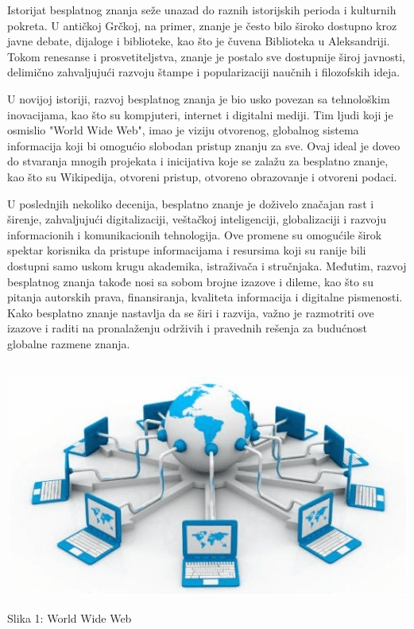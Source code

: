 \documentclass[a4paper]{article}
\begin{document}
{Istorijat besplatnog znanja seže unazad do raznih istorijskih perioda i kulturnih pokreta. U antičkoj Grčkoj, na primer, znanje je često bilo široko dostupno kroz javne debate, dijaloge i biblioteke, kao što je čuvena Biblioteka u Aleksandriji. Tokom renesanse i prosvetiteljstva, znanje je postalo sve dostupnije široj javnosti, delimično zahvaljujući razvoju štampe i popularizaciji naučnih i filozofskih ideja.

U novijoj istoriji, razvoj besplatnog znanja je bio usko povezan sa tehnološkim inovacijama, kao što su kompjuteri, internet i digitalni mediji. Tim ljudi koji je osmislio "World Wide Web", imao je viziju otvorenog, globalnog sistema informacija koji bi omogućio slobodan pristup znanju za sve. Ovaj ideal je doveo do stvaranja mnogih projekata i inicijativa koje se zalažu za besplatno znanje, kao što su Wikipedija, otvoreni pristup, otvoreno obrazovanje i otvoreni podaci.

U poslednjih nekoliko decenija, besplatno znanje je doživelo značajan rast i širenje, zahvaljujući digitalizaciji, veštačkoj inteligenciji, globalizaciji i razvoju informacionih i komunikacionih tehnologija. Ove promene su omogućile širok spektar korisnika da pristupe informacijama i resursima koji su ranije bili dostupni samo uskom krugu akademika, istraživača i stručnjaka.
Međutim, razvoj besplatnog znanja takođe nosi sa sobom brojne izazove i dileme, kao što su pitanja autorskih prava, finansiranja, kvaliteta informacija i digitalne pismenosti. Kako besplatno znanje nastavlja da se širi i razvija, važno je razmotriti ove izazove i raditi na pronalaženju održivih i pravednih rešenja za budućnost globalne razmene znanja.

\setlength{\parskip}{1em}


\begin{verbatim}

\end{verbatim}

\begin{center}
\includegraphics[scale=0.4]{world-wide-web.png}
\end{center}
\caption{Slika 1: World Wide Web}
\label{world wide web}

}
\end{document}
